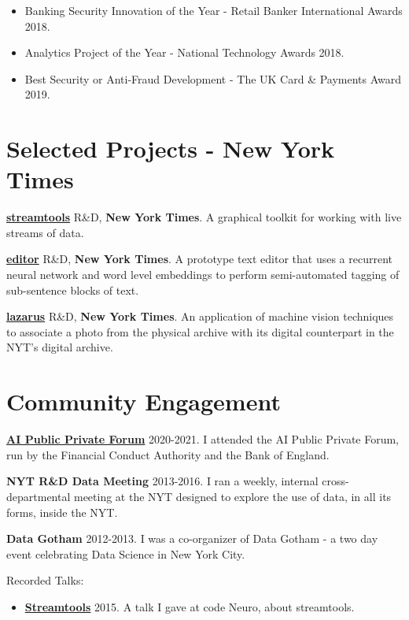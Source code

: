 \documentclass[line, overlapped]{res}
\providecommand{\tightlist}{%
  \setlength{\itemsep}{0pt}\setlength{\parskip}{0pt}}
\begin{document}
\begin{resume}
  \begin{itemize}
  \tightlist
  \item
    Banking Security Innovation of the Year - Retail Banker International Awards 2018.
  \item
    Analytics Project of the Year - National Technology Awards 2018.
  \item
    Best Security or Anti-Fraud Development - The UK Card \& Payments Award 2019.
  \end{itemize}
\section{Selected Projects - New York Times}
	\href{https://github.com/nytlabs/streamtools}{\textbf{streamtools}} R\&D, \textbf{New York Times}. A graphical toolkit for working with live streams of data.

	\href{http://nytlabs.com/projects/editor.html}{\textbf{editor}} R\&D, \textbf{New York Times}. A prototype text editor that uses a recurrent neural network and word level embeddings to perform semi-automated tagging of sub-sentence blocks of text.

	\href{http://nytlabs.com/projects/lazarus.html}{\textbf{lazarus}} R\&D, \textbf{New York Times}. An application of machine vision techniques to associate a photo from the physical archive with its digital counterpart in the NYT's digital archive.

\section{Community Engagement}

	\href{https://www.bankofengland.co.uk/research/fintech/ai-public-private-forum}{\textbf{AI Public Private Forum}} 2020-2021. I attended the AI Public
  Private Forum, run by the Financial Conduct Authority and the Bank of
  England.

  \textbf{NYT R\&D Data Meeting} 2013-2016. I ran a weekly, internal
  cross-departmental meeting at the NYT designed to explore the use of
  data, in all its forms, inside the NYT.

  \textbf{Data Gotham} 2012-2013. I was a co-organizer of Data Gotham -
  a two day event celebrating Data Science in New York City.

  Recorded Talks:
  \begin{itemize}
  \tightlist
	  \item \href{https://www.youtube.com/watch?v=23FgdEHOt0w}{\textbf{Streamtools}} 2015. A talk  I gave at code Neuro, about streamtools.


\end{itemize}
\end{resume}
\end{document}

